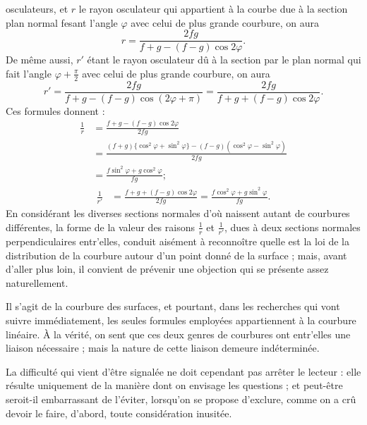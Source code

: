 \documentclass[11pt,a4paper]{article}
\begin{document}
osculateurs, et $r$ le rayon osculateur qui appartient à la courbe due à la
section \ill{} plan normal fesant l'angle $\varphi$
avec celui de plus grande courbure, on aura
\[
  r = \frac{2fg}{f + g - (f-g)\cos 2\varphi} .
\]
De même aussi, $r'$ étant le rayon osculateur dû à la section par le plan
normal qui fait l'angle $\varphi + \frac{\pi}{2}$ avec celui de plus grande
courbure, on aura
\[
  r' = \frac{2fg}{f + g - (f-g)\cos (2\varphi + \pi)}
     = \frac{2fg}{f + g + (f-g)\cos 2\varphi} .
\]
Ces formules donnent :
\begin{align*}
  \frac{1}{r} &= \frac{f + g - (f-g)\cos 2\varphi}{2fg}\\
     &= \frac{(f+g)\{\cos^{2}\varphi + \sin^{2}\varphi\}
               - (f-g)(\cos^{2}\varphi - \sin^{2}\varphi)}{2fg}\\
     &= \frac{f\sin^{2}\varphi + g\cos^{2}\varphi}{fg} ;
\end{align*}
\begin{align*}
  \frac{1}{r'} &= \frac{f + g + (f-g)\cos 2\varphi}{2fg}
     = \frac{f\cos^{2}\varphi + g\sin^{2}\varphi}{fg} .
\end{align*}
En considérant les diverses sections normales d'où naissent autant de
courbures différentes, la forme de la valeur des raisons $\frac{1}{r}$ et
$\frac{1}{r'}$, dues à deux sections normales perpendiculaires entr'elles,
conduit aisément à reconnoître quelle est la loi de la distribution de la
courbure autour d'un point donné de la surface ; mais, avant d'aller plus
loin, il convient de prévenir une objection qui se présente assez
naturellement.

Il s'agit de la courbure des surfaces, et pourtant, dans les recherches qui
vont suivre immédiatement, les seules formules employées appartiennent à la
courbure linéaire. À la vérité, on sent que ces deux genres de courbures ont
entr'elles une liaison nécessaire ; mais la nature de cette liaison demeure
indéterminée.


La difficulté qui vient d'être signalée ne doit cependant pas arrêter le
lecteur : elle résulte uniquement de la manière dont on envisage les
questions ; et peut-être seroit-il embarrassant de l'éviter, lorsqu'on se
propose d'exclure, comme on a crû devoir le faire, d'abord, toute
considération inusitée.
\end{document}

